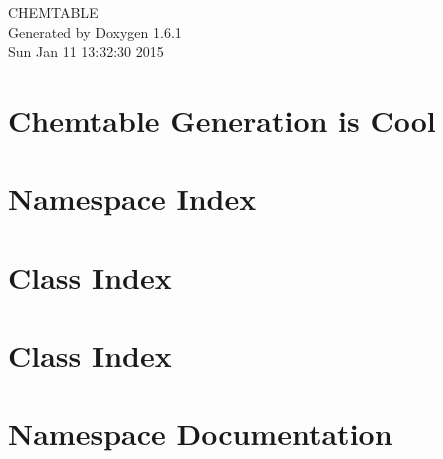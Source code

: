 \documentclass[a4paper]{book}
\begin{document}
\hypersetup{pageanchor=false}
\begin{titlepage}
\vspace*{7cm}
\begin{center}
{\Large CHEMTABLE }\\
\vspace*{1cm}
{\large Generated by Doxygen 1.6.1}\\
\vspace*{0.5cm}
{\small Sun Jan 11 13:32:30 2015}\\
\end{center}
\end{titlepage}
\clearemptydoublepage
{}
\tableofcontents
\clearemptydoublepage
{}
\hypersetup{pageanchor=true}
\chapter{Chemtable Generation is Cool}
\label{index}\hypertarget{index}{}
\chapter{Namespace Index}

\chapter{Class Index}

\chapter{Class Index}

\chapter{Namespace Documentation}




\end{document}
